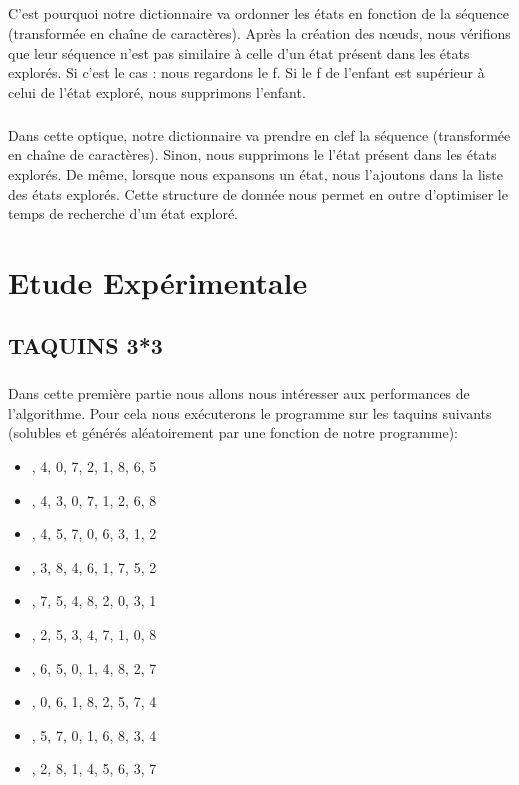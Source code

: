 \documentclass[10pt,a4paper]{report}
\begin{document}
\paragraph{}{C'est pourquoi notre dictionnaire va ordonner les états en fonction de la séquence (transformée en chaîne de caractères). Après la création des nœuds, nous vérifions que leur séquence n'est pas similaire à celle d'un état présent dans les états explorés. Si c'est le cas : nous regardons le f. Si le f de l'enfant est supérieur à celui de l'état exploré, nous supprimons l'enfant.}
\paragraph{}{Dans cette optique, notre dictionnaire va prendre en clef la séquence (transformée en chaîne de caractères). Sinon, nous supprimons le l'état présent dans les états explorés. De même, lorsque nous expansons un état, nous l'ajoutons dans la liste des états explorés. Cette structure de donnée nous permet en outre d'optimiser le temps de recherche d'un état exploré.}



\chapter{Etude Expérimentale}
\section{TAQUINS 3*3}
\paragraph{}{Dans cette première partie nous allons nous intéresser aux performances de l'algorithme. Pour cela nous exécuterons le programme sur les taquins suivants (solubles et générés aléatoirement par une fonction de notre programme): }
\begin{itemize}
\item {}, 4, 0, 7, 2, 1, 8, 6, 5\rbrack
\item {}, 4, 3, 0, 7, 1, 2, 6, 8\rbrack
\item {}, 4, 5, 7, 0, 6, 3, 1, 2\rbrack
\item {}, 3, 8, 4, 6, 1, 7, 5, 2\rbrack
\item {}, 7, 5, 4, 8, 2, 0, 3, 1\rbrack
\item {}, 2, 5, 3, 4, 7, 1, 0, 8\rbrack
\item {}, 6, 5, 0, 1, 4, 8, 2, 7\rbrack
\item {}, 0, 6, 1, 8, 2, 5, 7, 4\rbrack
\item {}, 5, 7, 0, 1, 6, 8, 3, 4\rbrack
\item {}, 2, 8, 1, 4, 5, 6, 3, 7\rbrack
\end{itemize}
\end{document}
